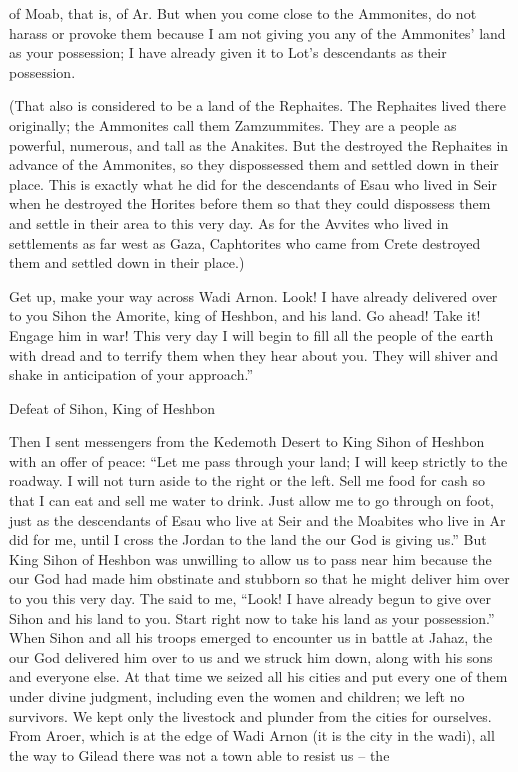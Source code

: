 {of Moab,
that is, of Ar.
But when you come
close
to the Ammonites,
do not
harass
or
provoke
them because
I am not
giving
you any of the Ammonites’
land
as your possession;
I have already given
it to Lot’s
descendants
as their possession.
\par }{\PP {}(That also
is considered
to be a land
of the Rephaites.
The Rephaites
lived
there originally;
the Ammonites
call
them Zamzummites.
They are a people
as powerful,
numerous,
and tall
as the Anakites.
But the
{}
destroyed
the Rephaites in advance of the Ammonites, so they dispossessed
them and settled
down in their place.
This
is exactly what
he did
for the descendants
of Esau
who lived
in Seir
when he destroyed
the
Horites
before
them so that
they could dispossess
them and settle in
their area
to
this very
day.
As for the Avvites
who lived
in settlements
as far
west as Gaza,
Caphtorites
who came from
Crete
destroyed
them and settled down
in their place.)
\par }{\PP {}Get
up, make
your way across
Wadi
Arnon.
Look! I have already delivered
over
to you Sihon
the Amorite,
king
of Heshbon,
and his land.
Go
ahead! Take
it! Engage
him in war!
This
very day
I will begin
to fill
all
the people
of the earth
with dread
and to terrify
them when they hear
about
you. They will shiver
and shake in anticipation
of your approach.”
\par }{\SH Defeat of Sihon, King of Heshbon
\par }{\PP {}Then I sent
messengers
from the Kedemoth
Desert
to
King
Sihon
of Heshbon
with an offer
of peace:
“Let me pass
through your land;
I will keep strictly
to the roadway. I will not
turn aside
to the right
or the left.
Sell me food
for cash
so that I can eat
and sell
me water
to drink.
Just allow
me to go through
on foot,
just
as the descendants
of Esau
who live
at Seir
and the Moabites
who live
in Ar
did
for me, until
I cross
the Jordan
to
the land
the {}
our God
is giving us.”
But King
Sihon
of Heshbon
was unwilling
to allow us to pass
near him because
the {}
our God
had made him obstinate
and stubborn
so that
he might deliver
him over to you
this
very day.
The
{}
said
to
me, “Look! I have already begun
to give
over Sihon
and his land
to you. Start
right now to take
his land
as your possession.”
When
Sihon
and all
his troops
emerged
to encounter us in battle
at Jahaz,
the {}
our God
delivered
him over to us and we struck
him down, along
with his sons
and everyone else.
At that time
we
seized
all
his cities
and put
every
one of them under divine
judgment, including even the women
and children;
we left
no survivors.
We kept
only
the livestock
and plunder
from the cities
for ourselves.
From Aroer,
which
is at the edge
of Wadi
Arnon
(it is the city
in the wadi), all the way
to Gilead
there was
not
a town
able to resist
us
– the

}
